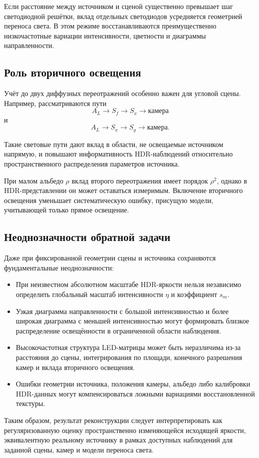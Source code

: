 Если расстояние между источником и сценой существенно превышает шаг светодиодной решётки, вклад отдельных светодиодов усредняется геометрией переноса света. В этом режиме восстанавливаются преимущественно низкочастотные вариации интенсивности, цветности и диаграммы направленности.

\subsection{Роль вторичного освещения}

Учёт до двух диффузных переотражений особенно важен для угловой сцены. Например, рассматриваются пути
\begin{equation}
A_L
\rightarrow
S_f
\rightarrow
S_x
\rightarrow
\text{камера}
\end{equation}
и
\begin{equation}
A_L
\rightarrow
S_x
\rightarrow
S_y
\rightarrow
\text{камера}.
\end{equation}

Такие световые пути дают вклад в области, не освещаемые источником напрямую, и повышают информативность HDR-наблюдений относительно пространственного распределения параметров источника.

При малом альбедо $\rho$ вклад второго переотражения имеет порядок $\rho^2$, однако в HDR-представлении он может оставаться измеримым. Включение вторичного освещения уменьшает систематическую ошибку, присущую модели, учитывающей только прямое освещение.

\subsection{Неоднозначности обратной задачи}

Даже при фиксированной геометрии сцены и источника сохраняются фундаментальные неоднозначности:
\begin{itemize}
    \item При неизвестном абсолютном масштабе HDR-яркости нельзя независимо определить глобальный масштаб интенсивности $\eta$ и коэффициент $s_m$.
    \item Узкая диаграмма направленности с большой интенсивностью и более широкая диаграмма с меньшей интенсивностью могут формировать близкое распределение освещённости в ограниченной области наблюдения.
    \item Высокочастотная структура LED-матрицы может быть неразличима из-за расстояния до сцены, интегрирования по площади, конечного разрешения камер и вклада вторичного освещения.
    \item Ошибки геометрии источника, положения камеры, альбедо либо калибровки HDR-данных могут компенсироваться ложными вариациями восстановленной текстуры.
\end{itemize}

Таким образом, результат реконструкции следует интерпретировать как регуляризованную оценку пространственно изменяющейся исходящей яркости, эквивалентную реальному источнику в рамках доступных наблюдений для заданной сцены, камер и модели переноса света.

\endinput
